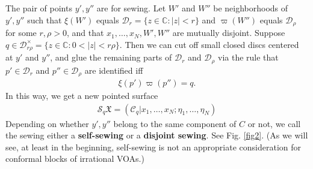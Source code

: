 \documentclass[11pt,b5paper,notitlepage]{article}
\theoremstyle{definition}
\theoremstyle{plain}
\newcommand{\mc}{\mathcal}
\newcommand{\Cbb}{\mathbb C}
\newcommand{\<}{\left\langle}
\renewcommand{\>}{\right\rangle}
\newcommand{\fx}{\mathfrak{X}}
\numberwithin{equation}{section}
\begin{document}
The pair of points $y',y''$ are for sewing. Let $W'$ and $W''$ be neighborhoods of $y',y''$ such that $\xi(W')$ equals $\mc D_r=\{z\in\Cbb:|z|<r\}$ and $\varpi(W'')$ equals $\mc D_\rho$ for some $r,\rho>0$, and that $x_1,\dots,x_N,W',W''$ are mutually disjoint. Suppose $q\in \mc D_{r\rho}^\times=\{z\in\Cbb:0<|z|<r\rho\}$. Then we can cut off small closed discs centered at $y'$ and $y''$, and glue the remaining parts of $\mc D_r$ and $\mc D_\rho$ via the rule that $p'\in\mc D_r$ and $p''\in\mc D_\rho$ are identified iff
\begin{align}
\xi(p')\varpi(p'')=q.
\end{align}
In this way, we get a new pointed surface
\begin{align}
\mc S_q\fx=(\mc C_q|x_1,\dots,x_N;\eta_1,\dots,\eta_N)
\end{align}
Depending on whether $y',y''$ belong to the same component of $C$ or not, we call the sewing either a \textbf{self-sewing} or a \textbf{disjoint sewing}. See Fig. \ref{fig2}. (As we will see, at least in the beginning, self-sewing is not an appropriate consideration for conformal blocks of irrational VOAs.)
\end{document}

